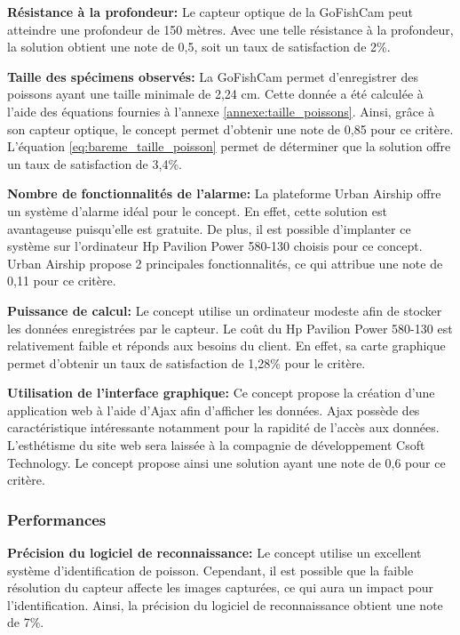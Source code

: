 \textbf{Résistance à la profondeur:} Le capteur optique de la GoFishCam peut atteindre une profondeur de 150 mètres. Avec une telle résistance à la profondeur, la solution obtient une note de 0,5, soit un taux de satisfaction de 2\%. \vspace{5mm}

\textbf{Taille des spécimens observés:} La GoFishCam permet d'enregistrer des poissons ayant une taille minimale de 2,24 cm. Cette donnée a été calculée à l'aide des équations fournies à l'annexe \ref{annexe:taille_poissons}. Ainsi, grâce à son capteur optique, le concept permet d'obtenir une note de 0,85 pour ce critère. L'équation \ref{eq:bareme_taille_poisson} permet de déterminer que la solution offre un taux de satisfaction de 3,4\%.
\vspace{5mm}

\textbf{Nombre de fonctionnalités de l'alarme:} La plateforme Urban Airship offre un système d'alarme idéal pour le concept. En effet, cette solution est avantageuse puisqu'elle est gratuite. De plus, il est possible d'implanter ce système sur l'ordinateur Hp Pavilion Power 580-130 choisis pour ce concept. Urban Airship propose 2 principales fonctionnalités, ce qui attribue une note de 0,11 pour ce critère.
\vspace{5mm}

\textbf{Puissance de calcul:} Le concept utilise un ordinateur modeste afin de stocker les données enregistrées par le capteur. Le coût du Hp Pavilion Power 580-130 est relativement faible et réponds aux besoins du client. En effet, sa carte graphique permet d'obtenir un taux de satisfaction de 1,28\% pour le critère. 
\vspace{5mm}

\textbf{Utilisation de l'interface graphique:} Ce concept propose la création d'une application web à l'aide d'Ajax afin d'afficher les données. Ajax possède des caractéristique intéressante notamment pour la rapidité de l'accès aux données. L'esthétisme du site web sera laissée à la compagnie de développement Csoft Technology. Le concept propose ainsi une solution ayant une note de 0,6 pour ce critère.


\subsubsection{Performances}

\textbf{Précision du logiciel de reconnaissance:} Le concept utilise un excellent système d'identification de poisson. Cependant, il est possible que la faible résolution du capteur affecte les images capturées, ce qui aura un impact pour l'identification. Ainsi, la précision du logiciel de reconnaissance obtient une note de 7\%. \vspace{5mm}

